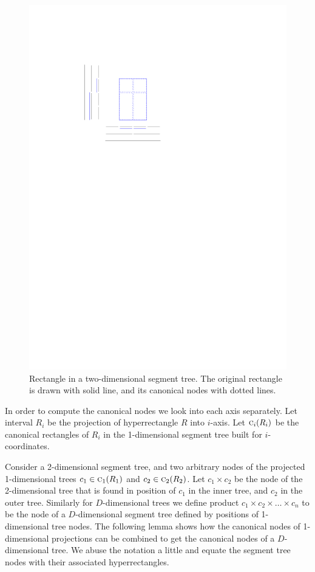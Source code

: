\documentclass[english,gradu]{tktltiki2018}
\begin{document}
\begin{figure}\centering
	\includegraphics[scale=0.7,page=1]{fig/canon2d}
	\caption{Rectangle in a two-dimensional segment tree. The original rectangle is drawn with solid line, and its canonical nodes with dotted lines.}\label{fig:canon2d}
\end{figure}

In order to compute the canonical nodes we look into each axis separately.
Let interval $R_i$ be the projection of hyperrectangle $R$ into $i$-axis.
Let $\canoni{R_i}{i}$ be the canonical rectangles of $R_i$ in the 1-dimensional segment tree built for $i$-coordinates.

Consider a 2-dimensional segment tree, and two arbitrary nodes of the projected 1-dimensional trees $c_1\in\canoni{R_1}{1}$ and $c_2\in\canoni{R_2}{2}$.
Let $c_1\times c_2$ be the node of the 2-dimensional tree that is found in position of $c_1$ in the inner tree, and $c_2$ in the outer tree.
Similarly for $D$-dimensional trees we define product $c_1\times c_2\times\dots\times c_n$ to be the node of a $D$-dimensional segment tree defined by positions of 1-dimensional tree nodes.
The following lemma shows how the canonical nodes of 1-dimensional projections can be combined to get the canonical nodes of a $D$-dimensional tree.
We abuse the notation a little and equate the segment tree nodes with their associated hyperrectangles.
\end{document}
